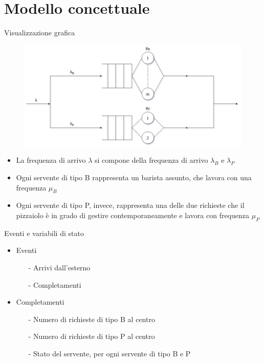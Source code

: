 \documentclass[xcolor=table]{beamer}
\begin{document}
\section{Modello concettuale}
\begin{frame}{Visualizzazione grafica}\justifying
\begin{figure}[H]
\centering
\includegraphics[scale=0.2]{conceptual_model}
\end{figure}
\begin{itemize}
\item La frequenza di arrivo $\lambda$ si compone della frequenza di arrivo $\lambda_B$ e $\lambda_P$ 
\item Ogni servente di tipo B rappresenta un barista assunto, che lavora con una frequenza $\mu_B$
\item Ogni servente di tipo P, invece, rappresenta una delle due richieste che il pizzaiolo è in grado di gestire contemporaneamente e lavora con frequenza $\mu_P$
\end{itemize}
\end{frame}

\begin{frame}{Eventi e variabili di stato}\justifying
\begin{itemize}
\item Eventi
\begin{itemize}
\item[-] Arrivi dall'esterno
\item[-] Completamenti
\end{itemize}

\item[]

\item Completamenti
\begin{itemize}
\item[-] Numero di richieste di tipo B al centro
\item[-] Numero di richieste di tipo P al centro
\item[-] Stato del servente, per ogni servente di tipo B e P
\end{itemize}
\end{itemize}
\end{frame}
\end{document}
